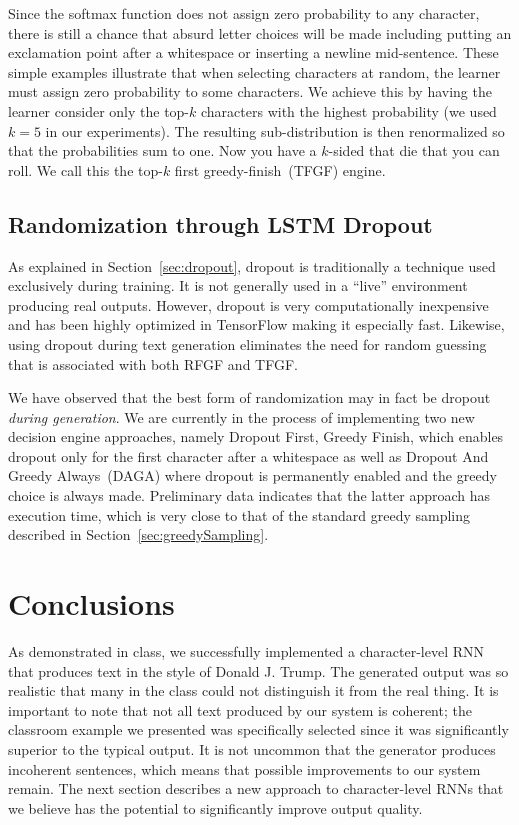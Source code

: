 \documentclass{article}
\begin{document}
Since the softmax function does not assign zero probability to any character, there is still a chance that absurd letter choices will be made including putting an exclamation point after a whitespace or inserting a newline mid-sentence.  These simple examples illustrate that when selecting characters at random, the learner must assign zero probability to some characters. We achieve this by having the learner consider only the top-$k$ characters with the highest probability (we used $k=5$ in our experiments). The resulting sub-distribution is then renormalized so that the probabilities sum to one. Now you have a $k$-sided that die that you can roll. We call this the top-$k$ first greedy-finish~(TFGF) engine.


\subsection{Randomization through LSTM Dropout}

As explained in Section~\ref{sec:dropout}, dropout is traditionally a technique used exclusively during training.  It is not generally used in a ``live'' environment producing real outputs.  However, dropout is very computationally inexpensive and has been highly optimized in TensorFlow making it especially fast.  Likewise, using dropout during text generation eliminates the need for random guessing that is associated with both RFGF and TFGF.

We have observed that the best form of randomization may in fact be dropout \textit{during generation}.  We are currently in the process of implementing two new decision engine approaches, namely Dropout First, Greedy Finish, which enables dropout only for the first character after a whitespace as well as Dropout And Greedy Always~(DAGA) where dropout is permanently enabled and the greedy choice is always made.  Preliminary data indicates that the latter approach has execution time, which is very close to that of the standard greedy sampling described in Section~\ref{sec:greedySampling}.

\section{Conclusions}

As demonstrated in class, we successfully implemented a character-level RNN that produces text in the style of Donald J. Trump.  The generated output was so realistic that many in the class could not distinguish it from the real thing.  It is important to note that not all text produced by our system is coherent; the classroom example we presented was specifically selected since it was significantly superior to the typical output.  It is not uncommon that the generator produces incoherent sentences, which means that possible improvements to our system remain.  The next section describes a new approach to character-level RNNs that we believe has the potential to significantly improve output quality.
\end{document}
